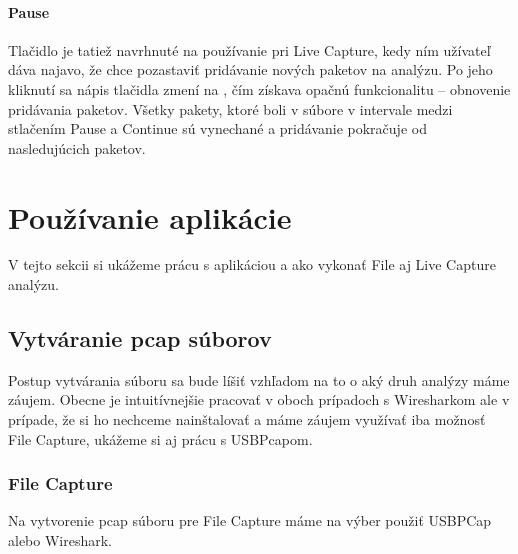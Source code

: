 \paragraph{Pause}
\hfill\break
Tlačidlo je tatiež navrhnuté na používanie pri Live Capture, kedy ním užívateľ dáva najavo, že chce pozastaviť pridávanie nových paketov na analýzu. Po jeho kliknutí sa nápis tlačidla zmení na , čím získava opačnú funkcionalitu -- obnovenie pridávania paketov. Všetky pakety, ktoré boli v súbore v intervale medzi stlačením Pause a Continue sú vynechané a pridávanie pokračuje od nasledujúcich paketov.



\section{Používanie aplikácie}
V tejto sekcii si ukážeme prácu s aplikáciou a ako vykonať File aj Live Capture analýzu. 

\subsection{Vytváranie pcap súborov}
Postup vytvárania súboru sa bude líšiť vzhľadom na to o aký druh analýzy máme záujem. Obecne je intuitívnejšie pracovať v oboch prípadoch s Wiresharkom ale v prípade, že si ho nechceme nainštalovať a máme záujem využívať iba možnosť File Capture, ukážeme si aj prácu s USBPcapom.

\subsubsection{File Capture}
Na vytvorenie pcap súboru pre File Capture máme na výber použiť USBPCap alebo Wireshark.

